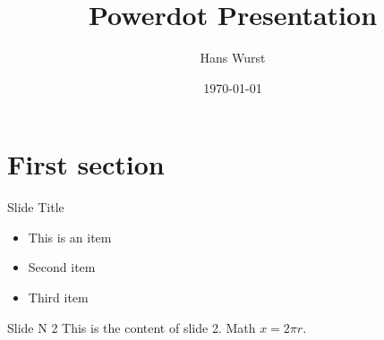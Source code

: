 \documentclass[
    paper=screen,
    orient=landscape
]{powerdot}
\title{Powerdot Presentation}
\author{Hans Wurst}
\date{\today}
\begin{document}
\maketitle
 
\section{First section}
 
\begin{slide}{Slide Title}
    \begin{itemize}
    \item This is an item
    \item Second item
    \item Third item
    \end{itemize}
\end{slide}
 
\begin{slide}{Slide N 2}
    This is the content of slide 2.
    Math $x=2\pi r$.
\end{slide}
\end{document}

